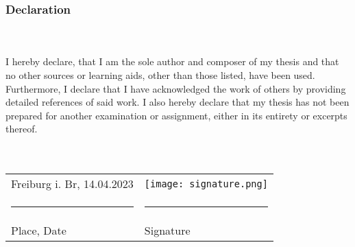 \subsubsection{Declaration}\hfill\\\\
\noindent I hereby declare, that I am the sole author and composer of my thesis and that no other sources or learning aids, other than those listed, have been used. 
Furthermore, I declare that I have acknowledged the work of others by providing detailed references of said work.  \newline
I also hereby declare that my thesis has not been prepared for another examination or assignment, either in its entirety or excerpts thereof. 
\\
\\
\\
\begin{tabular}{p{} l}
  Freiburg i. Br, 14.04.2023   &   \texttt{[image: signature.png]} \\
  \rule{\textwidth/3}{0.4pt}   &   \rule{\textwidth/3}{0.4pt} \\
  Place, Date                  &   Signature
\end{tabular}